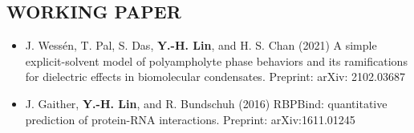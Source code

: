 \documentclass[11pt,letterpaper, sans]{article}
\newcommand{\tname}[1]{{\bf #1}}%
\newcommand{\newsec}[1]{\subsection*{\hspace{-1.5pt}\uppercase{#1}}}
\begin{document}
\begin{flushleft}






\newsec{Working Paper}

\begin{itemize}[leftmargin=*, itemsep=0in]

\item 
J. Wessén, T. Pal,  S. Das, \tname{Y.-H. Lin}, and H. S. Chan (2021)
A simple explicit-solvent model of polyampholyte phase behaviors and its ramifications for dielectric effects in biomolecular condensates.
Preprint: arXiv: 2102.03687 

\item 
J. Gaither, \tname{Y.-H. Lin}, and R. Bundschuh (2016) 
RBPBind: quantitative prediction of protein-RNA interactions. 
Preprint: arXiv:1611.01245 %



\end{itemize} 

\end{flushleft}

\bigskip
\end{document}
